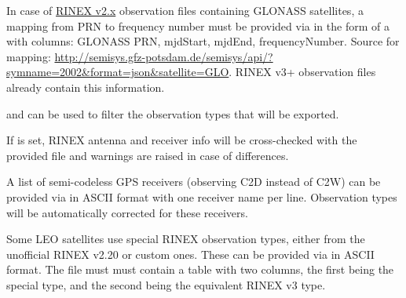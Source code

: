 In case of \href{https://files.igs.org/pub/data/format/rinex211.txt}{RINEX v2.x} observation files
containing GLONASS satellites, a mapping from PRN
to frequency number must be provided via 
in the form of a  with columns: GLONASS PRN, mjdStart, mjdEnd, frequencyNumber.
Source for mapping: \url{http://semisys.gfz-potsdam.de/semisys/api/?symname=2002&format=json&satellite=GLO}.
RINEX v3+ observation files already contain this information.

 and  can be used to filter
the observation types that will be exported.

If  is set, RINEX antenna and receiver info
will be cross-checked with the provided file and warnings are raised in case of differences.

A list of semi-codeless GPS receivers (observing C2D instead of C2W) can be provided via
 in ASCII format with one receiver name per line.
Observation types will be automatically corrected for these receivers.

Some LEO satellites use special RINEX observation types, either from the unofficial RINEX v2.20
or custom ones. These can be provided via 
in ASCII format. The file must  must contain a table with two columns, the first being the special type,
and the second being the equivalent RINEX v3 type.




